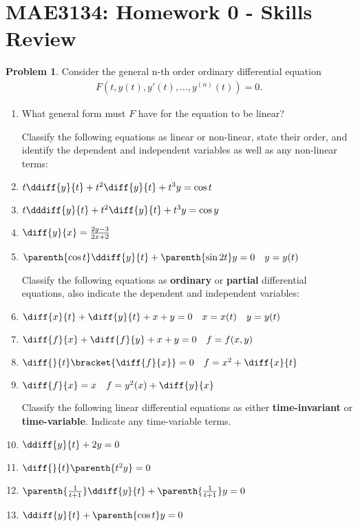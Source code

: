 \documentclass[10pt]{article}
\date{}
\theoremstyle{definition}
\newtheorem{prob}{Problem}[section]
\newenvironment{subprob}%
{\renewcommand{\theenumi}{\alph{enumi}}\renewcommand{\labelenumi}{(\theenumi)}\begin{enumerate}}%
{\end{enumerate}}%
\begin{document}
\pagestyle{empty}
\section*{MAE3134: Homework 0 - Skills Review}
\vspace*{-0.4cm}

\begin{prob}
    Consider the general n-th order ordinary differential equation
    \begin{align*}
        F(t, y(t), y'(t), \ldots, y^{(n)}(t)) = 0.
    \end{align*}

    \begin{subprob}
        \item What general form must \( F \) have for the equation to be linear?

        Classify the following equations as linear or non-linear, state their order, and identify the dependent and independent variables as well as any non-linear terms:
    \item \( t \ddiff{y}{t} + t^2 \diff{y}{t} + t^3 y = \cos t \)
    \item \( t \dddiff{y}{t} + t^2 \diff{y}{t} + t^3 y = \cos y \)
    \item \( \diff{y}{x} = \frac{2 y - 3}{2 x + 2} \) 
    \item \( \parenth{\cos t} \ddiff{y}{t} + \parenth{\sin 2 t} y = 0 \quad y = y(t)\)

        Classify the following equations as \textbf{ordinary} or \textbf{partial} differential equations, also indicate the dependent and independent variables:

    \item \( \diff{x}{t} + \diff{y}{t} + x + y = 0 \quad x=x(t) \quad y = y(t)\)
    \item \( \diff{f}{x} + \diff{f}{y} + x + y = 0 \quad f = f(x, y)\)
    \item \( \diff{}{t} \bracket{\diff{f}{x}} = 0 \quad f = x^2 + \diff{x}{t}\)
    \item \( \diff{f}{x} = x \quad f = y^2(x)  + \diff{y}{x}\)

        Classify the following linear differential equations as either \textbf{time-invariant} or \textbf{time-variable}. Indicate any time-variable terms.
    \item \( \ddiff{y}{t} + 2 y = 0\)
    \item \( \diff{}{t}\parenth{t^2 y} = 0 \)
    \item \( \parenth{\frac{1}{t+1}}\ddiff{y}{t} + \parenth{\frac{1}{t+1}} y = 0 \)
    \item \( \ddiff{y}{t} + \parenth{\cos{t}} y = 0 \)
    \end{subprob}

\end{prob}
\end{document}

